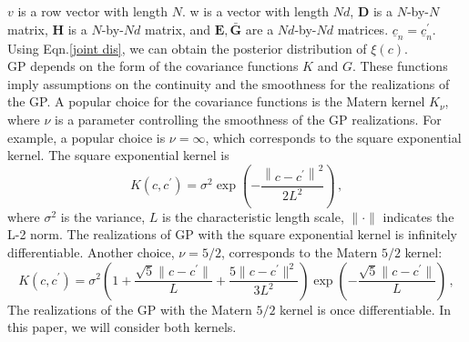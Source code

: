 \documentclass[a4paper,onecolumn]{article}
\theoremstyle{remark}
\begin{document}
$v$ is a row vector with length $N$. w is a vector with length $Nd$, $\mathbf{D}$ is a 
$N$-by-$N$ matrix, $\mathbf{H}$ is a $N$-by-$Nd$ matrix, and $\mathbf{E},\bar{\mathbf{G}}$ are a $Nd$-by-$Nd$ matrices.
$\underline{c}_n=\underline{c}_n^\prime$. Using Eqn.\eqref{joint dis}, we
can obtain the posterior distribution of $\xi(c)$.
\\

\indent GP depends on the form of the covariance functions $K$ and $G$.
These functions imply assumptions on the continuity and the smoothness for the realizations
of the GP. A popular choice for the covariance functions is the Matern kernel $K_\nu$,
where $\nu$ is a parameter controlling the smoothness of the GP realizations.
For example, a popular choice is
$\nu=\infty$, which corresponds to the square exponential kernel.
The square exponential kernel is
\begin{equation}
    K(c, c^\prime) = \sigma^2 \exp\left(- \frac{\left\|c-c^\prime\right\|^2}{2L^2}\right)\,,
    \label{exp kernel}
\end{equation}
where $\sigma^2$ is the variance, $L$ is the characteristic length scale, $\|\cdot\|$ indicates
the L-2 norm.
The realizations of GP with the square exponential kernel is infinitely differentiable.
Another choice, $\nu=5/2$,  corresponds to the Matern $5/2$ kernel:
\begin{equation}
    K(c, c^\prime) = 
    \sigma^2 \left(1+\frac{\sqrt{5} \|c-c^\prime\|}{L}
    + \frac{5\|c-c^\prime\|^2}{3 L^2}\right) \exp\left(-\frac{\sqrt{5}\|c-c^\prime\|}{L}\right)\,,
    \label{Matern kernel}
\end{equation}
The realizations of the GP with the Matern $5/2$ kernel is once differentiable.
In this paper, we will consider both kernels. \\
\end{document}

